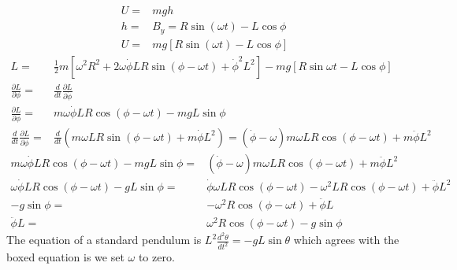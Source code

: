 \documentclass[12pt, a4paper]{article}
\begin{document}
\begin{align*}
U =& mgh
\\
h =& B_y = R\sin(\omega t)-L\cos\phi
\\
U =& mg[R\sin(\omega t)-L\cos\phi]
\end{align*}
\begin{align*}
L =& \tfrac{1}{2}m[
\omega^2R^2 + 2\omega\dot{\phi}LR\sin(\phi-\omega t) + \dot{\phi}^2L^2] - mg[R\sin \omega t-L\cos\phi]
\\
\frac{\partial L}{\partial\phi} =& \frac{d}{dt}\frac{\partial L}{\partial\dot{\phi}}
\\
\frac{\partial L}{\partial\phi} =& m\omega\dot{\phi}LR\cos(\phi-\omega t) - mgL\sin\phi
\\
\frac{d}{dt}\frac{\partial L}{\partial\dot{\phi}} =& \frac{d}{dt} \left(m\omega LR\sin(\phi-\omega t) + m\dot{\phi}L^2 \right) = (\dot{\phi}-\omega)m\omega LR\cos(\phi-\omega t) + m\ddot{\phi}L^2
\end{align*}
\begin{align*}
m\omega\dot{\phi}LR\cos(\phi-\omega t) - mgL\sin\phi =& (\dot{\phi}-\omega)m\omega LR\cos(\phi-\omega t) + m\ddot{\phi}L^2
\\
\omega\dot{\phi}LR\cos(\phi-\omega t) - gL\sin\phi =& \dot{\phi}\omega LR\cos(\phi-\omega t)- \omega^2 LR\cos(\phi-\omega t) + \ddot{\phi}L^2
\\
- g\sin\phi =& - \omega^2R\cos(\phi-\omega t) + \ddot{\phi}L
\\
\ddot{\phi}L =& \boxed{\omega^2R\cos(\phi-\omega t) - g\sin\phi}
\end{align*}
The equation of a standard pendulum is $L^2\frac{d^2\theta}{dt^2}=-gL\sin\theta$ which agrees with the boxed equation is we set $\omega$ to zero.
	
	
	
	
	
\end{document}
